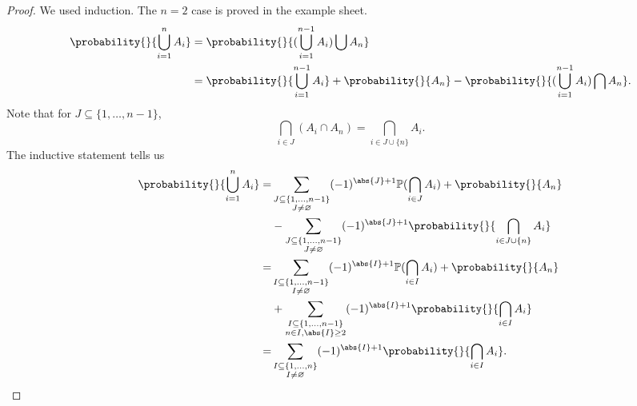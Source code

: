 \begin{proof}
    We used induction. The \(n = 2\) case is proved in the example sheet.
    \begin{align*}
        \probability{}{\bigcup_{i=1}^n A_i} &= \probability{}{(\bigcup_{i=1}^{n-1}A_i)\bigcup A_n}\\
        &= \probability{}{\bigcup_{i=1}^{n-1}A_i} + \probability{}{A_n} -\probability{}{(\bigcup_{i=1}^{n-1}A_i)\bigcap A_n}.
    \end{align*}
    Note that for \(J \subseteq \{1, \ldots ,n-1 \}\),
    \[
        \bigcap_{i\in J}(A_i\cap A_{n})=\bigcap_{i\in J\cup \{n\}}A_i.
    \]
    The inductive statement tells us
    \begin{align*}
        \probability{}{\bigcup_{i=1}^n A_i} =& \sum\limits_{\substack{J\subseteq \{1, \ldots ,n-1 \}\\ J \neq \varnothing}} (-1)^{\abs{J} +1} \mathbb{\MakeUppercase{p}}(\bigcap_{i\in J}A_i) + \probability{}{A_n}\\
        &- \sum\limits_{\substack{J\subseteq \{1, \ldots , n - 1 \}\\ J \neq \varnothing }}(-1)^{\abs{J} +1}\probability{}{\bigcap_{i\in J \cup \{n\}}A_i}\\
        =& \sum\limits_{\substack{I\subseteq \{1, \ldots ,n-1 \}\\ I \neq \varnothing}} (-1)^{\abs{I} +1} \mathbb{\MakeUppercase{p}}(\bigcap_{i\in I}A_i) + \probability{}{A_n}\\
        &+ \sum\limits_{\substack{I\subseteq \{1, \ldots , n - 1 \}\\ n\in I, \abs{I} \geq 2}}(-1)^{\abs{I} +1}\probability{}{\bigcap_{i\in I}A_i}\\
        =& \sum\limits_{\substack{I \subseteq \{1, \ldots ,n \}\\ I \neq \varnothing}} (-1)^{\abs{I} +1} \probability{}{\bigcap_{i\in I}A_i}.
    \end{align*}
\end{proof}

